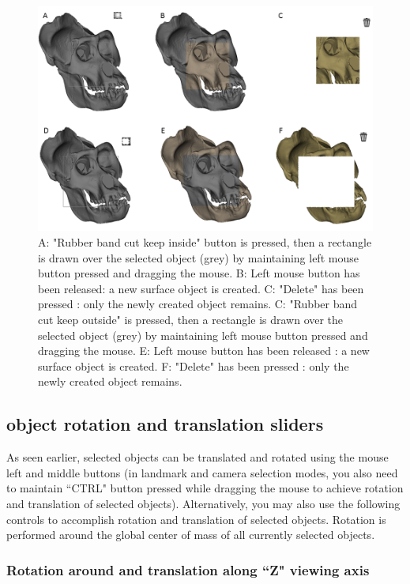 \begin{figure}
  \centering
  \includegraphics[scale=0.6]{images/06/objects/rubber_band_cut.png} 
	\caption{A: "Rubber band cut keep inside" button is pressed, then a rectangle is drawn over the selected object (grey) by maintaining left mouse button pressed and dragging the mouse. B: Left mouse button has been released: a new surface object is  created. C: "Delete" has been pressed : only the newly created  object remains. C: "Rubber band cut keep outside" is pressed, then a rectangle is drawn over the selected object (grey) by maintaining left mouse button pressed and dragging the mouse. E: Left mouse button has been released : a new surface object is  created. F: "Delete" has been pressed : only the newly created  object remains. }
\label{rubber_band_cut}
 
\end{figure}

\subsection{object rotation and translation sliders}
	As seen earlier, selected objects can be translated and rotated using the mouse left and middle buttons
(in landmark and camera selection modes, you also need to maintain ``CTRL" button pressed
while dragging the mouse to achieve rotation and translation of selected objects). Alternatively, you
may also use the following controls to accomplish rotation and translation of selected objects. Rotation
is performed around the global center of mass of all currently selected objects.

\subsubsection{Rotation around and translation along ``Z" viewing axis }

